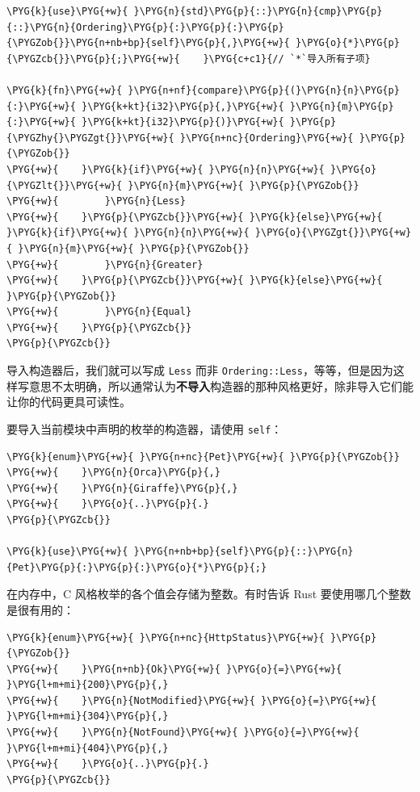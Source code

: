 \begin{Verbatim}[commandchars=\\\{\},breaklines=true,breakanywhere=true,fontsize=\codefont,xleftmargin=17bp]
\PYG{k}{use}\PYG{+w}{ }\PYG{n}{std}\PYG{p}{::}\PYG{n}{cmp}\PYG{p}{::}\PYG{n}{Ordering}\PYG{p}{:}\PYG{p}{:}\PYG{p}{\PYGZob{}}\PYG{n+nb+bp}{self}\PYG{p}{,}\PYG{+w}{ }\PYG{o}{*}\PYG{p}{\PYGZcb{}}\PYG{p}{;}\PYG{+w}{    }\PYG{c+c1}{// `*`导入所有子项}

\PYG{k}{fn}\PYG{+w}{ }\PYG{n+nf}{compare}\PYG{p}{(}\PYG{n}{n}\PYG{p}{:}\PYG{+w}{ }\PYG{k+kt}{i32}\PYG{p}{,}\PYG{+w}{ }\PYG{n}{m}\PYG{p}{:}\PYG{+w}{ }\PYG{k+kt}{i32}\PYG{p}{)}\PYG{+w}{ }\PYG{p}{\PYGZhy{}\PYGZgt{}}\PYG{+w}{ }\PYG{n+nc}{Ordering}\PYG{+w}{ }\PYG{p}{\PYGZob{}}
\PYG{+w}{    }\PYG{k}{if}\PYG{+w}{ }\PYG{n}{n}\PYG{+w}{ }\PYG{o}{\PYGZlt{}}\PYG{+w}{ }\PYG{n}{m}\PYG{+w}{ }\PYG{p}{\PYGZob{}}
\PYG{+w}{        }\PYG{n}{Less}
\PYG{+w}{    }\PYG{p}{\PYGZcb{}}\PYG{+w}{ }\PYG{k}{else}\PYG{+w}{ }\PYG{k}{if}\PYG{+w}{ }\PYG{n}{n}\PYG{+w}{ }\PYG{o}{\PYGZgt{}}\PYG{+w}{ }\PYG{n}{m}\PYG{+w}{ }\PYG{p}{\PYGZob{}}
\PYG{+w}{        }\PYG{n}{Greater}
\PYG{+w}{    }\PYG{p}{\PYGZcb{}}\PYG{+w}{ }\PYG{k}{else}\PYG{+w}{ }\PYG{p}{\PYGZob{}}
\PYG{+w}{        }\PYG{n}{Equal}
\PYG{+w}{    }\PYG{p}{\PYGZcb{}}
\PYG{p}{\PYGZcb{}}
\end{Verbatim}

导入构造器后，我们就可以写成 \texttt{Less} 而非 \texttt{Ordering::Less}，等等，但是因为这样写意思不太明确，所以通常认为\textbf{不导入}构造器的那种风格更好，除非导入它们能让你的代码更具可读性。

要导入当前模块中声明的枚举的构造器，请使用 \texttt{self}：

\begin{Verbatim}[commandchars=\\\{\},breaklines=true,breakanywhere=true,fontsize=\codefont,xleftmargin=17bp]
\PYG{k}{enum}\PYG{+w}{ }\PYG{n+nc}{Pet}\PYG{+w}{ }\PYG{p}{\PYGZob{}}
\PYG{+w}{    }\PYG{n}{Orca}\PYG{p}{,}
\PYG{+w}{    }\PYG{n}{Giraffe}\PYG{p}{,}
\PYG{+w}{    }\PYG{o}{..}\PYG{p}{.}
\PYG{p}{\PYGZcb{}}

\PYG{k}{use}\PYG{+w}{ }\PYG{n+nb+bp}{self}\PYG{p}{::}\PYG{n}{Pet}\PYG{p}{:}\PYG{p}{:}\PYG{o}{*}\PYG{p}{;}
\end{Verbatim}

在内存中，C 风格枚举的各个值会存储为整数。有时告诉 Rust 要使用哪几个整数是很有用的：

\begin{Verbatim}[commandchars=\\\{\},breaklines=true,breakanywhere=true,fontsize=\codefont,xleftmargin=17bp]
\PYG{k}{enum}\PYG{+w}{ }\PYG{n+nc}{HttpStatus}\PYG{+w}{ }\PYG{p}{\PYGZob{}}
\PYG{+w}{    }\PYG{n+nb}{Ok}\PYG{+w}{ }\PYG{o}{=}\PYG{+w}{ }\PYG{l+m+mi}{200}\PYG{p}{,}
\PYG{+w}{    }\PYG{n}{NotModified}\PYG{+w}{ }\PYG{o}{=}\PYG{+w}{ }\PYG{l+m+mi}{304}\PYG{p}{,}
\PYG{+w}{    }\PYG{n}{NotFound}\PYG{+w}{ }\PYG{o}{=}\PYG{+w}{ }\PYG{l+m+mi}{404}\PYG{p}{,}
\PYG{+w}{    }\PYG{o}{..}\PYG{p}{.}
\PYG{p}{\PYGZcb{}}
\end{Verbatim}

